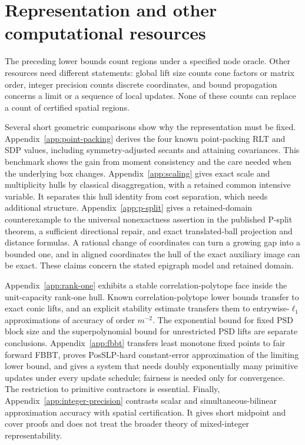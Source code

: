 \section{Representation and other computational resources}\label{sec:comparisons}
The preceding lower bounds count regions under a specified node oracle.
Other resources need different statements: global lift size counts cone
factors or matrix order, integer precision counts discrete coordinates, and
bound propagation concerns a limit or a sequence of local updates. None of
these counts can replace a count of certified spatial regions.

Several short geometric comparisons show why the representation must be
fixed. Appendix~\ref{app:point-packing} derives the four known
point-packing RLT and SDP values, including symmetry-adjusted secants and
attaining covariances. This benchmark shows the gain from moment
consistency and the care needed when the underlying box changes.
Appendix~\ref{app:scaling} gives exact scale and multiplicity hulls by
classical disaggregation, with a retained common intensive variable.
It separates this hull identity from cost separation, which needs
additional structure. Appendix~\ref{app:p-split} gives a retained-domain
counterexample to the universal nonexactness assertion in the published
P-split theorem, a sufficient directional repair, and exact translated-ball
projection and distance formulas. A rational change of coordinates can turn
a growing gap into a bounded
one, and in aligned coordinates the hull of the exact auxiliary image can be
exact. These claims concern the stated epigraph model and retained domain.

Appendix~\ref{app:rank-one} exhibits a stable correlation-polytope face
inside the unit-capacity rank-one hull. Known correlation-polytope lower
bounds transfer to exact conic lifts, and
an explicit stability estimate transfers them to entrywise-$\ell_1$
approximations of accuracy of order $m^{-2}$. The exponential bound for
fixed PSD block size and the superpolynomial bound for unrestricted PSD
lifts are separate conclusions. Appendix~\ref{app:fbbt}
transfers least monotone fixed points to fair forward FBBT, proves
PosSLP-hard constant-error approximation of the limiting lower bound,
and gives a system that needs doubly exponentially many primitive updates
under every update schedule; fairness is needed only for convergence. The
restriction to primitive contractors is essential.
Finally, Appendix~\ref{app:integer-precision} contrasts scalar and
simultaneous-bilinear approximation accuracy with spatial certification.
It gives short midpoint and cover proofs and does not treat the broader
theory of mixed-integer representability.
